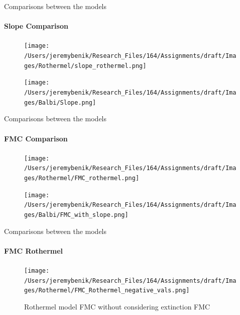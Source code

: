 \documentclass{beamer}
\begin{document}
\begin{frame} {Comparisons between the models}
\framesubtitle{Slope Comparison}
\begin{figure}
\centering
\begin{minipage}{.5\textwidth}
  \centering
  \texttt{[image: /Users/jeremybenik/Research\_Files/164/Assignments/draft/Images/Rothermel/slope\_rothermel.png]}
  \label{fig:test1}
\end{minipage}%
\begin{minipage}{.5\textwidth}
  \centering
  \texttt{[image: /Users/jeremybenik/Research\_Files/164/Assignments/draft/Images/Balbi/Slope.png]}
  \label{fig:test2}
\end{minipage}
\end{figure}
\end{frame}


\begin{frame} {Comparisons between the models}
\framesubtitle{FMC Comparison}
\begin{figure}
\centering
\begin{minipage}{.5\textwidth}
  \centering
  \texttt{[image: /Users/jeremybenik/Research\_Files/164/Assignments/draft/Images/Rothermel/FMC\_rothermel.png]}
  \label{fig:test1}
\end{minipage}%
\begin{minipage}{.5\textwidth}
  \centering
  \texttt{[image: /Users/jeremybenik/Research\_Files/164/Assignments/draft/Images/Balbi/FMC\_with\_slope.png]}
  \label{fig:test2}
\end{minipage}
\end{figure}
\end{frame}


\begin{frame} {Comparisons between the models}
\framesubtitle{FMC Rothermel}
\begin{figure}[h]
\centering
  \texttt{[image: /Users/jeremybenik/Research\_Files/164/Assignments/draft/Images/Rothermel/FMC\_Rothermel\_negative\_vals.png]}
  \caption{Rothermel model FMC without considering extinction FMC}
  \label{Balbi_flame_diagram}
\end{figure}
\end{frame}
\end{document}
